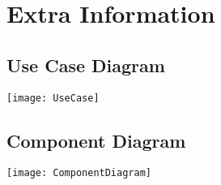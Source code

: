 \chapter{Extra Information}
\section{Use Case Diagram} \label{UseCase}
\texttt{[image: UseCase]}

\newpage

\section{Component Diagram}
\texttt{[image: ComponentDiagram]}